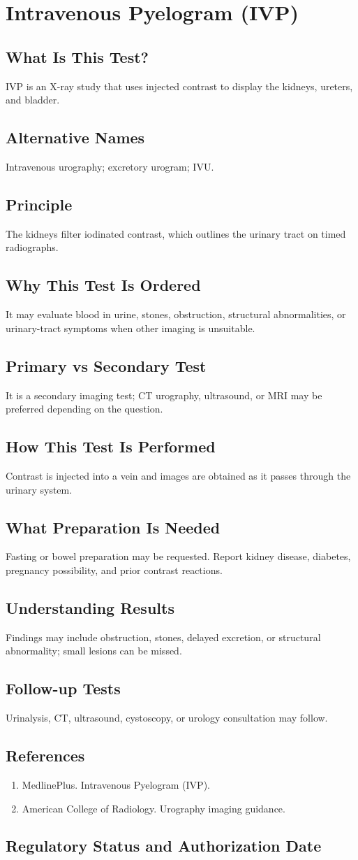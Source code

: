 \chapter{Intravenous Pyelogram (IVP)}
\section*{What Is This Test?} IVP is an X-ray study that uses injected contrast to display the kidneys, ureters, and bladder.\section*{Alternative Names} Intravenous urography; excretory urogram; IVU.\section*{Principle} The kidneys filter iodinated contrast, which outlines the urinary tract on timed radiographs.\section*{Why This Test Is Ordered} It may evaluate blood in urine, stones, obstruction, structural abnormalities, or urinary-tract symptoms when other imaging is unsuitable.\section*{Primary vs Secondary Test} It is a secondary imaging test; CT urography, ultrasound, or MRI may be preferred depending on the question.\section*{How This Test Is Performed} Contrast is injected into a vein and images are obtained as it passes through the urinary system.\section*{What Preparation Is Needed} Fasting or bowel preparation may be requested. Report kidney disease, diabetes, pregnancy possibility, and prior contrast reactions.\section*{Understanding Results} Findings may include obstruction, stones, delayed excretion, or structural abnormality; small lesions can be missed.\section*{Follow-up Tests} Urinalysis, CT, ultrasound, cystoscopy, or urology consultation may follow.\section*{References} \begin{enumerate}\item MedlinePlus. Intravenous Pyelogram (IVP).\item American College of Radiology. Urography imaging guidance.\end{enumerate}\clearpage\section*{Regulatory Status and Authorization Date}\clearpage
